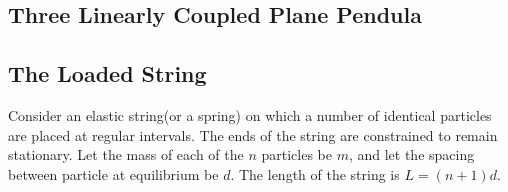 \documentclass[11pt,a4paper]{article}
\begin{document}
\subsection{Three Linearly Coupled Plane Pendula}











\subsection{The Loaded String}
Consider an elastic string(or a spring) on which a number of identical particles are placed at regular intervals. The ends of the string are constrained to remain stationary. Let the mass of each of the $n$ particles be $m$, and let the spacing between particle at equilibrium be $d$. The length of the string is $L = (n+1)d$. 




















\end{document}
